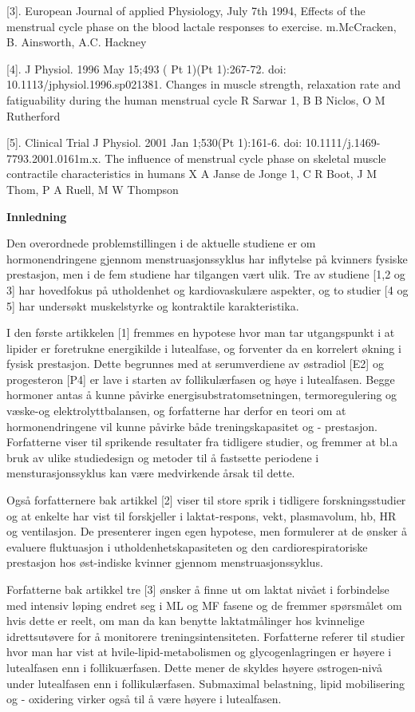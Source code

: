 \documentclass[
  letterpaper,
  DIV=11,
  numbers=noendperiod]{scrreprt}
\begin{document}
{[}3{]}. European Journal of applied Physiology, July 7th 1994, Effects
of the menstrual cycle phase on the blood lactale responses to exercise.
m.McCracken, B. Ainsworth, A.C. Hackney

{[}4{]}. J Physiol. 1996 May 15;493 ( Pt 1)(Pt 1):267-72. doi:
10.1113/jphysiol.1996.sp021381. Changes in muscle strength, relaxation
rate and fatiguability during the human menstrual cycle R Sarwar 1, B B
Niclos, O M Rutherford

{[}5{]}. Clinical Trial J Physiol. 2001 Jan 1;530(Pt 1):161-6. doi:
10.1111/j.1469-7793.2001.0161m.x. The influence of menstrual cycle phase
on skeletal muscle contractile characteristics in humans X A Janse de
Jonge 1, C R Boot, J M Thom, P A Ruell, M W Thompson

\textbf{Innledning}

Den overordnede problemstillingen i de aktuelle studiene er om
hormonendringene gjennom menstruasjonssyklus har inflytelse på kvinners
fysiske prestasjon, men i de fem studiene har tilgangen vært ulik. Tre
av studiene {[}1,2 og 3{]} har hovedfokus på utholdenhet og
kardiovaskulære aspekter, og to studier {[}4 og 5{]} har undersøkt
muskelstyrke og kontraktile karakteristika.

I den første artikkelen {[}1{]} fremmes en hypotese hvor man tar
utgangspunkt i at lipider er foretrukne energikilde i lutealfase, og
forventer da en korrelert økning i fysisk prestasjon. Dette begrunnes
med at serumverdiene av østradiol {[}E2{]} og progesteron {[}P4{]} er
lave i starten av follikulærfasen og høye i lutealfasen. Begge hormoner
antas å kunne påvirke energisubstratomsetningen, termoregulering og
væske-og elektrolyttbalansen, og forfatterne har derfor en teori om at
hormonendringene vil kunne påvirke både treningskapasitet og -
prestasjon. Forfatterne viser til sprikende resultater fra tidligere
studier, og fremmer at bl.a bruk av ulike studiedesign og metoder til å
fastsette periodene i mensturasjonssyklus kan være medvirkende årsak til
dette.

Også forfatternere bak artikkel {[}2{]} viser til store sprik i
tidligere forskningsstudier og at enkelte har vist til forskjeller i
laktat-respons, vekt, plasmavolum, hb, HR og ventilasjon. De presenterer
ingen egen hypotese, men formulerer at de ønsker å evaluere fluktuasjon
i utholdenhetskapasiteten og den cardiorespiratoriske prestasjon hos
øst-indiske kvinner gjennom menstruasjonssyklus.

Forfatterne bak artikkel tre {[}3{]} ønsker å finne ut om laktat nivået
i forbindelse med intensiv løping endret seg i ML og MF fasene og de
fremmer spørsmålet om hvis dette er reelt, om man da kan benytte
laktatmålinger hos kvinnelige idrettsutøvere for å monitorere
treningsintensiteten. Forfatterne referer til studier hvor man har vist
at hvile-lipid-metabolismen og glycogenlagringen er høyere i lutealfasen
enn i follikuærfasen. Dette mener de skyldes høyere østrogen-nivå under
lutealfasen enn i follikulærfasen. Submaximal belastning, lipid
mobilisering og - oxidering virker også til å være høyere i lutealfasen.
\end{document}
